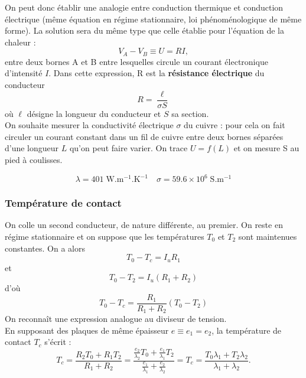 \documentclass[11pt,a4paper]{report}
\begin{document}
On peut donc établir une analogie entre conduction thermique et conduction électrique (même équation en régime stationnaire, loi phénoménologique de même forme). La solution sera du même type que celle établie pour l'équation de la chaleur : 
\begin{equation}
	V_A - V_B \equiv U = R I,
\end{equation}
entre deux bornes A et B entre lesquelles circule un courant électronique d'intensité $I$. Dans cette expression, R est la \textbf{résistance électrique} du conducteur
\begin{equation}
	R = \frac{\ell}{\sigma S}
\end{equation}
où $\ell$ désigne la longueur du conducteur et $S$ sa section.\\ 

On souhaite mesurer la conductivité électrique $\sigma$ du cuivre : pour cela on fait circuler un courant constant dans un fil de cuivre entre deux bornes séparées d'une longueur $L$ qu'on peut faire varier. On trace $U = f(L)$ et on mesure S au pied à coulisses.

\begin{equation}
	\lambda = 401\;\text{W}.\text{m}^{-1}.\text{K}^{-1} \quad
	\sigma = 59.6\times 10^{6}\;\text{S}.\text{m}^{-1}
\end{equation}

\subsubsection*{Température de contact}

On colle un second conducteur, de nature différente, au premier. On reste en régime stationnaire et on suppose que les températures $T_0$ et $T_2$ sont maintenues constantes. On a alors
\begin{equation}
	T_0 - T_c = I_u R_1
\end{equation}
et
\begin{equation}
	T_0 - T_2 = I_u\left(R_1 + R_2\right)
\end{equation}
d'où
\begin{equation}
	T_0 - T_c = \frac{R_1}{R_1 + R_2}\left(T_0 - T_2\right)
\end{equation}
On reconnaît une expression analogue au diviseur de tension.\\

En supposant des plaques de même épaisseur $e \equiv e_1 = e_2$, la température de contact $T_c$ s'écrit :
\begin{equation}
	\displaystyle{T_c = \frac{R_2T_0 + R_1 T_2}{R_1 + R_2} = \frac{\frac{e_2}{\lambda_2}T_0 + \frac{e_1}{\lambda_1}T_2}{\frac{e_1}{\lambda_1} + \frac{e_2}{\lambda_2}}}
	= T_c = \frac{T_0\lambda_1 + T_2\lambda_2}{\lambda_1 + \lambda_2}.
\end{equation}
\end{document}
